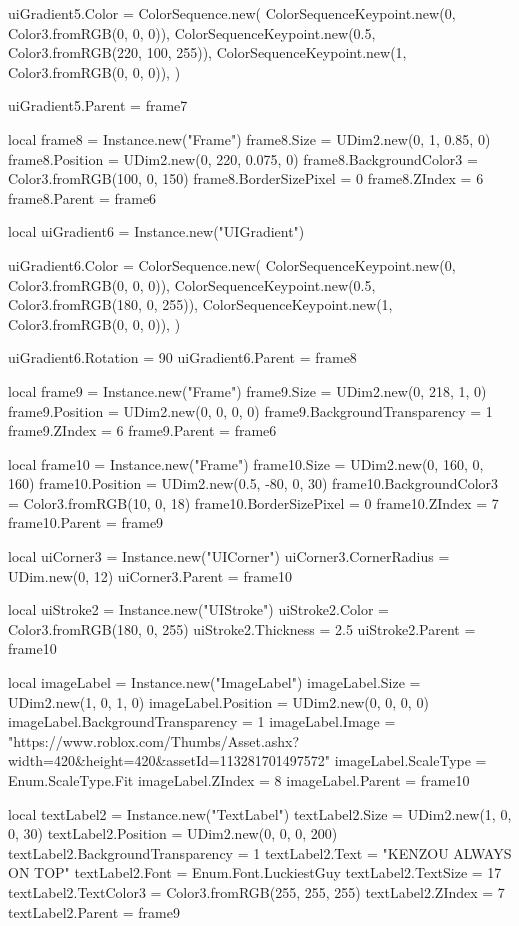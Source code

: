   uiGradient5.Color = ColorSequence.new({
    ColorSequenceKeypoint.new(0, Color3.fromRGB(0, 0, 0)),
    ColorSequenceKeypoint.new(0.5, Color3.fromRGB(220, 100, 255)),
    ColorSequenceKeypoint.new(1, Color3.fromRGB(0, 0, 0)),
  })

  uiGradient5.Parent = frame7

  local frame8 = Instance.new("Frame")
  frame8.Size = UDim2.new(0, 1, 0.85, 0)
  frame8.Position = UDim2.new(0, 220, 0.075, 0)
  frame8.BackgroundColor3 = Color3.fromRGB(100, 0, 150)
  frame8.BorderSizePixel = 0
  frame8.ZIndex = 6
  frame8.Parent = frame6

  local uiGradient6 = Instance.new("UIGradient")

  uiGradient6.Color = ColorSequence.new({
    ColorSequenceKeypoint.new(0, Color3.fromRGB(0, 0, 0)),
    ColorSequenceKeypoint.new(0.5, Color3.fromRGB(180, 0, 255)),
    ColorSequenceKeypoint.new(1, Color3.fromRGB(0, 0, 0)),
  })

  uiGradient6.Rotation = 90
  uiGradient6.Parent = frame8

  local frame9 = Instance.new("Frame")
  frame9.Size = UDim2.new(0, 218, 1, 0)
  frame9.Position = UDim2.new(0, 0, 0, 0)
  frame9.BackgroundTransparency = 1
  frame9.ZIndex = 6
  frame9.Parent = frame6

  local frame10 = Instance.new("Frame")
  frame10.Size = UDim2.new(0, 160, 0, 160)
  frame10.Position = UDim2.new(0.5, -80, 0, 30)
  frame10.BackgroundColor3 = Color3.fromRGB(10, 0, 18)
  frame10.BorderSizePixel = 0
  frame10.ZIndex = 7
  frame10.Parent = frame9

  local uiCorner3 = Instance.new("UICorner")
  uiCorner3.CornerRadius = UDim.new(0, 12)
  uiCorner3.Parent = frame10

  local uiStroke2 = Instance.new("UIStroke")
  uiStroke2.Color = Color3.fromRGB(180, 0, 255)
  uiStroke2.Thickness = 2.5
  uiStroke2.Parent = frame10

  local imageLabel = Instance.new("ImageLabel")
  imageLabel.Size = UDim2.new(1, 0, 1, 0)
  imageLabel.Position = UDim2.new(0, 0, 0, 0)
  imageLabel.BackgroundTransparency = 1
  imageLabel.Image = "https://www.roblox.com/Thumbs/Asset.ashx?width=420&height=420&assetId=113281701497572"
  imageLabel.ScaleType = Enum.ScaleType.Fit
  imageLabel.ZIndex = 8
  imageLabel.Parent = frame10

  local textLabel2 = Instance.new("TextLabel")
  textLabel2.Size = UDim2.new(1, 0, 0, 30)
  textLabel2.Position = UDim2.new(0, 0, 0, 200)
  textLabel2.BackgroundTransparency = 1
  textLabel2.Text = "KENZOU ALWAYS ON TOP"
  textLabel2.Font = Enum.Font.LuckiestGuy
  textLabel2.TextSize = 17
  textLabel2.TextColor3 = Color3.fromRGB(255, 255, 255)
  textLabel2.ZIndex = 7
  textLabel2.Parent = frame9

